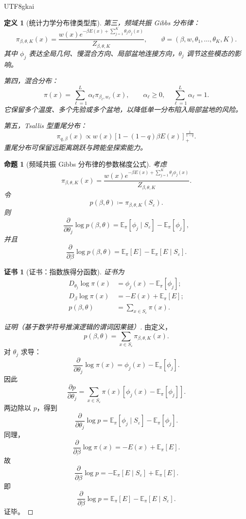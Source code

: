 \documentclass[12pt]{article}
\newtheorem{definition}{定义}[section]
\newtheorem{proposition}{命题}[section]
\newtheorem{Certificate}{证书}[section]
\newcommand{\DefEq}{\coloneqq}
\begin{document}
\begin{CJK*}{UTF8}{gkai}
\begin{definition}[统计力学分布律类型库]
第三，频域共振 Gibbs 分布律：
\[
  \pi_{\beta,\theta,K}(x)
  =
  \frac{
  w(x)e^{-\beta E(x)+\sum_{j=1}^{K}\theta_j\phi_j(x)}
  }{
  Z_{\beta,\theta,K}
  },
  \qquad
  \vartheta=(\beta,w,\theta_1,\ldots,\theta_K,K).
\]
其中 \(\phi_j\) 表达全局几何、慢混合方向、局部盆地连接方向，\(\theta_j\) 调节这些模态的影响。

第四，混合分布：
\[
  \pi(x)=\sum_{\ell=1}^{L}\alpha_\ell\pi_{\beta_\ell,w_\ell}(x),
  \qquad
  \alpha_\ell\ge0,\quad \sum_{\ell=1}^{L}\alpha_\ell=1.
\]
它保留多个温度、多个先验或多个盆地，以降低单一分布陷入局部盆地的风险。

第五，Tsallis 型重尾分布：
\[
  \pi_{q,\beta}(x)
  \propto
  w(x)
  \left[
  1-(1-q)\beta E(x)
  \right]_+^{\frac1{1-q}}.
\]
重尾分布可保留远距离跳跃与跨能垒探索能力。
\end{definition}

\begin{proposition}[频域共振 Gibbs 分布律的参数梯度公式]
\label{prop:tex55-gradient-law}
考虑
\[
  \pi_{\beta,\theta,K}(x)
  =
  \frac{
  w(x)e^{-\beta E(x)+\sum_{j=1}^{K}\theta_j\phi_j(x)}
  }{
  Z_{\beta,\theta,K}
  }.
\]
令
\[
  p(\beta,\theta)
  \DefEq
  \pi_{\beta,\theta,K}(S_\varepsilon).
\]
则
\[
  \frac{\partial}{\partial\theta_j}\log p(\beta,\theta)
  =
  \mathbb E_{\pi}[\phi_j\mid S_\varepsilon]
  -
  \mathbb E_{\pi}[\phi_j],
\]
并且
\[
  \frac{\partial}{\partial\beta}\log p(\beta,\theta)
  =
  \mathbb E_{\pi}[E]
  -
  \mathbb E_{\pi}[E\mid S_\varepsilon].
\]
\end{proposition}

\begin{Certificate}[证书：指数族得分函数]
\label{cert:tex55-gradient-law}
证书为
\[
\begin{aligned}
  D_{\theta_j}\log\pi(x)
  &=
  \phi_j(x)-\mathbb E_\pi[\phi_j];\\
  D_{\beta}\log\pi(x)
  &=
  -E(x)+\mathbb E_\pi[E];\\
  p(\beta,\theta)&=\sum_{x\in S_\varepsilon}\pi(x).
\end{aligned}
\]
\end{Certificate}

\begin{proof}[证明（基于数学符号推演逻辑的谓词因果链）]
由定义，
\[
  p(\beta,\theta)=\sum_{x\in S_\varepsilon}\pi_{\beta,\theta,K}(x).
\]
对 \(\theta_j\) 求导：
\[
  \frac{\partial}{\partial\theta_j}\log\pi(x)
  =
  \phi_j(x)-\mathbb E_\pi[\phi_j].
\]
因此
\[
  \frac{\partial p}{\partial\theta_j}
  =
  \sum_{x\in S_\varepsilon}
  \pi(x)
  \left[
  \phi_j(x)-\mathbb E_\pi[\phi_j]
  \right].
\]
两边除以 \(p\)，得到
\[
  \frac{\partial}{\partial\theta_j}\log p
  =
  \mathbb E_{\pi}[\phi_j\mid S_\varepsilon]
  -
  \mathbb E_{\pi}[\phi_j].
\]
同理，
\[
  \frac{\partial}{\partial\beta}\log\pi(x)
  =
  -E(x)+\mathbb E_\pi[E].
\]
故
\[
  \frac{\partial}{\partial\beta}\log p
  =
  -\mathbb E_{\pi}[E\mid S_\varepsilon]
  +
  \mathbb E_{\pi}[E].
\]
即
\[
  \frac{\partial}{\partial\beta}\log p
  =
  \mathbb E_{\pi}[E]
  -
  \mathbb E_{\pi}[E\mid S_\varepsilon].
\]
证毕。
\end{proof}


\end{CJK*}
\end{document}
